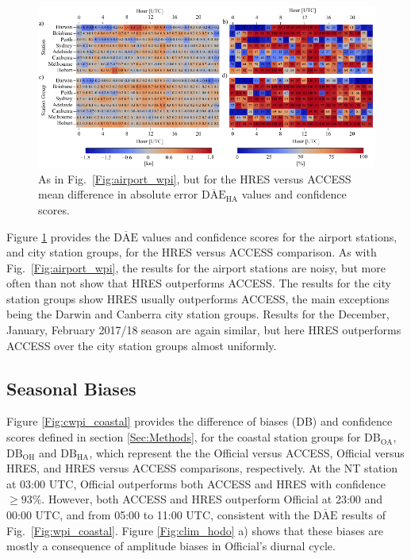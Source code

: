 \documentclass[twocol]{ametsoc}
\begin{document}
\begin{figure}
\centering
\includegraphics[width=39pc]{airport_wpi_EA.pdf}
\caption{As in Fig.~\ref{Fig:airport_wpi}, but for the HRES versus ACCESS mean difference in absolute error $\overline{\text{DAE}}_\text{HA}$ values and confidence scores.
}
\label{Fig:airport_wpi_EA}
\end{figure}

Figure \ref{Fig:airport_wpi_EA} provides the $\overline{\text{DAE}}$ values and confidence scores for the airport stations, and city station groups, for the HRES versus ACCESS comparison. As with Fig.~\ref{Fig:airport_wpi}, the results for the airport stations are noisy, but more often than not show that HRES outperforms ACCESS. The results for the city station groups show HRES usually outperforms ACCESS, the main exceptions being the Darwin and Canberra city station groups. Results for the December, January, February 2017/18 season are again similar, but here HRES outperforms ACCESS over the city station groups almost uniformly. 

\subsection{Seasonal Biases}
\label{Sec:Seasonal}
Figure \ref{Fig:cwpi_coastal} provides the difference of biases (DB) and confidence scores defined in section \ref{Sec:Methods}, for the coastal station groups for $\text{DB}_\text{OA}$, $\text{DB}_\text{OH}$ and $\text{DB}_\text{HA}$, which represent the the Official versus ACCESS, Official versus HRES, and HRES versus ACCESS comparisons, respectively. At the NT station at 03:00 UTC, Official outperforms both ACCESS and HRES with confidence $\geq 93\%$. However, both ACCESS and HRES outperform Official at 23:00 and 00:00 UTC, and from 05:00 to 11:00 UTC, consistent with the $\overline{\text{DAE}}$ results of Fig.~\ref{Fig:wpi_coastal}. Figure \ref{Fig:clim_hodo} a) shows that these biases are mostly a consequence of amplitude biases in Official's diurnal cycle.
\end{document}
